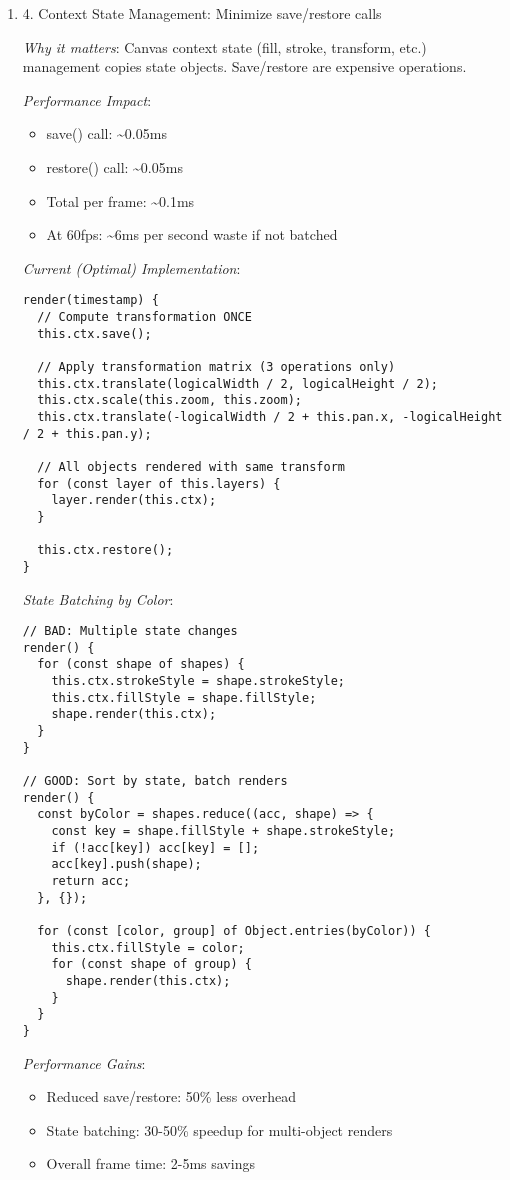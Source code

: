 \documentclass[11pt]{article}
\begin{document}
\begin{enumerate}
\begin{enumerate}
\noindent\rule{\textwidth}{0.5pt}
\item 4. Context State Management: Minimize save/restore calls
\label{sec:org7aec3b5}

\emph{Why it matters}: Canvas context state (fill, stroke, transform, etc.) management copies state objects. Save/restore are expensive operations.

\emph{Performance Impact}:
\begin{itemize}
\item save() call: \textasciitilde{}0.05ms
\item restore() call: \textasciitilde{}0.05ms
\item Total per frame: \textasciitilde{}0.1ms
\item At 60fps: \textasciitilde{}6ms per second waste if not batched
\end{itemize}

\emph{Current (Optimal) Implementation}:
\begin{verbatim}
render(timestamp) {
  // Compute transformation ONCE
  this.ctx.save();
  
  // Apply transformation matrix (3 operations only)
  this.ctx.translate(logicalWidth / 2, logicalHeight / 2);
  this.ctx.scale(this.zoom, this.zoom);
  this.ctx.translate(-logicalWidth / 2 + this.pan.x, -logicalHeight / 2 + this.pan.y);
  
  // All objects rendered with same transform
  for (const layer of this.layers) {
    layer.render(this.ctx);
  }
  
  this.ctx.restore();
}
\end{verbatim}

\emph{State Batching by Color}:
\begin{verbatim}
// BAD: Multiple state changes
render() {
  for (const shape of shapes) {
    this.ctx.strokeStyle = shape.strokeStyle;
    this.ctx.fillStyle = shape.fillStyle;
    shape.render(this.ctx);
  }
}

// GOOD: Sort by state, batch renders
render() {
  const byColor = shapes.reduce((acc, shape) => {
    const key = shape.fillStyle + shape.strokeStyle;
    if (!acc[key]) acc[key] = [];
    acc[key].push(shape);
    return acc;
  }, {});
  
  for (const [color, group] of Object.entries(byColor)) {
    this.ctx.fillStyle = color;
    for (const shape of group) {
      shape.render(this.ctx);
    }
  }
}
\end{verbatim}

\emph{Performance Gains}:
\begin{itemize}
\item Reduced save/restore: 50\% less overhead
\item State batching: 30-50\% speedup for multi-object renders
\item Overall frame time: 2-5ms savings
\end{itemize}


\end{enumerate}
\end{enumerate}
\end{document}
